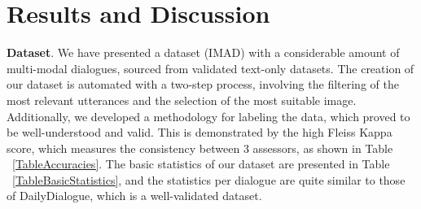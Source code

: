 \documentclass[11pt]{article}
\begin{document}
\begin{table}
\centering
\tabcolsep=0.11cm

\caption{Test split metrics for both finetuned models and BlenderBot 400M.}
\label{table:test_metrics}
\end{table}

\begin{table}[pt]
\centering
{}
\caption{Metrics on test split by source for both finetuned models and BlenderBot 400M. We report metrics for top-3 most frequent sources.}
\label{table:test_metrics_by_source}
\end{table}


\section{Results and Discussion}


\textbf{Dataset}. We have presented a dataset (IMAD) with a considerable amount of multi-modal dialogues, sourced from validated text-only datasets. The creation of our dataset is automated with a two-step process, involving the filtering of the most relevant utterances and the selection of the most suitable image. Additionally, we developed a methodology for labeling the data, which proved to be well-understood and valid. This is demonstrated by the high Fleiss Kappa score, which measures the consistency between 3 assessors, as shown in Table ~\ref{TableAccuracies}. The basic statistics of our dataset are presented in Table ~\ref{TableBasicStatistics}, and the statistics per dialogue are quite similar to those of DailyDialogue, which is a well-validated dataset.
\end{document}
